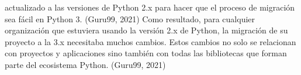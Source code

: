 actualizado a las versiones de Python 2.x para hacer que el proceso de migración sea fácil
en Python 3. (Guru99, 2021)
Como resultado, para cualquier organización que estuviera usando la versión 2.x de Python,
la migración de su proyecto a la 3.x necesitaba muchos cambios. Estos cambios no solo se
relacionan con proyectos y aplicaciones sino también con todas las bibliotecas que forman
parte del ecosistema Python. (Guru99, 2021)

